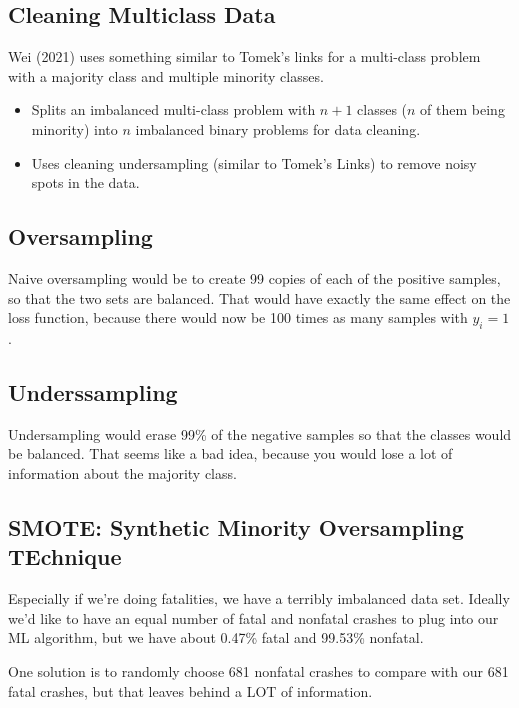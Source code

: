 \subsection{Cleaning Multiclass Data}

Wei (2021) \cite{WEI_2021} uses something similar to Tomek's links for a multi-class problem with a majority class and multiple minority classes.  

\begin{itemize}
	\item Splits an imbalanced multi-class problem with $n+1$ classes ($n$ of them being minority) into $n$ imbalanced binary problems for data cleaning.  
	\item Uses cleaning undersampling (similar to Tomek's Links) to remove noisy spots in the data.
\end{itemize}


\subsection{Oversampling}

Naive oversampling would be to create 99 copies of each of the positive samples, so that the two sets are balanced.  That would have exactly the same effect on the loss function, because there would now be 100 times as many samples with $y_i=1$.  


\subsection{Underssampling}

Undersampling would erase 99\% of the negative samples so that the classes would be balanced.  That seems like a bad idea, because you would lose a lot of information about the majority class.  

\subsection{SMOTE:  Synthetic Minority Oversampling TEchnique}

Especially if we're doing fatalities, we have a terribly imbalanced data set.  Ideally we'd like to have an equal number of fatal and nonfatal crashes to plug into our ML algorithm, but we have about 0.47\% fatal and 99.53\% nonfatal.  

One solution is to randomly choose 681 nonfatal crashes to compare with our 681 fatal crashes, but that leaves behind a LOT of information.  


